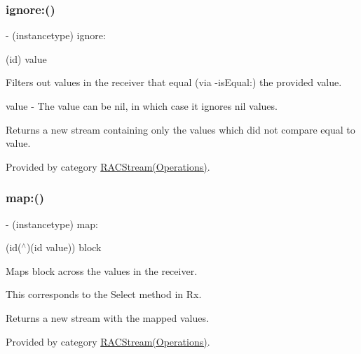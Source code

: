 \subsubsection{\texorpdfstring{ignore\+:()}{ignore:()}\hspace{0.1cm}{\footnotesize\ttfamily [3/3]}}
{\footnotesize\ttfamily -\/ (instancetype) ignore\+: \begin{DoxyParamCaption}\item[{(id)}]{value }\end{DoxyParamCaption}}

Filters out values in the receiver that equal (via -\/is\+Equal\+:) the provided value.

value -\/ The value can be {\ttfamily nil}, in which case it ignores {\ttfamily nil} values.

Returns a new stream containing only the values which did not compare equal to {\ttfamily value}. 

Provided by category \mbox{\hyperlink{category_r_a_c_stream_07_operations_08_aa0bf73c86006176e745390ee2b3645b2}{R\+A\+C\+Stream(\+Operations)}}.

\mbox{\label{interface_r_a_c_stream_ae8e14cc70fb3979e6128d28b003bba3f}} 
\subsubsection{\texorpdfstring{map\+:()}{map:()}\hspace{0.1cm}{\footnotesize\ttfamily [1/3]}}
{\footnotesize\ttfamily -\/ (instancetype) map\+: \begin{DoxyParamCaption}\item[{(id($^\wedge$)(id value))}]{block }\end{DoxyParamCaption}}

Maps {\ttfamily block} across the values in the receiver.

This corresponds to the {\ttfamily Select} method in Rx.

Returns a new stream with the mapped values. 

Provided by category \mbox{\hyperlink{category_r_a_c_stream_07_operations_08_ae8e14cc70fb3979e6128d28b003bba3f}{R\+A\+C\+Stream(\+Operations)}}.

